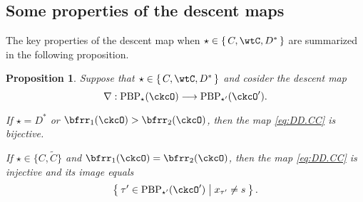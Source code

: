 \documentclass[12pt,a4paper]{amsart}
\numberwithin{equation}{section}
\newtheorem{prop}[thm]{Proposition}
\theoremstyle{remark}
\def\ckcOp{\ckcO^{\prime}}
\def\PBP{\mathrm{PBP}}
\begin{document}
\subsection{Some properties of the descent maps}





The key properties of the descent map when $\star\in \set{C,\wtC,D^*}$ are summarized in the following proposition.

\begin{prop}\label{prop:CC.bij}
Suppose that $\star \in \set{C,\wtC,D^*}$ and cosider the
descent map
\begin{equation}\label{eq:DD.CC}
\nabla: \PBP_\star(\ckcO)\longrightarrow  \PBP_{\star'}(\ckcOp).
\end{equation}
\begin{enuma}
\item If
$\star=D^*$ or $\bfrr_1(\ckcO)>\bfrr_2(\ckcO)$, then
the map \eqref{eq:DD.CC}  is bijective.

\item If  $\star\in \{C,\widetilde C\}$ and $\bfrr_1(\ckcO)=\bfrr_2(\ckcO)$, then the  map \eqref{eq:DD.CC} is injective and its image equals
\[
\Set{\tau'\in \PBP_{\star'}(\ckcOp)| x_{\tau'}\neq s}.
\]
\end{enuma}
\end{prop}
\end{document}

